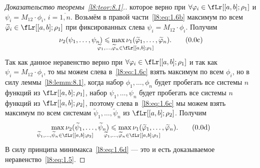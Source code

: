 \begin{proof}[Доказательство теоремы~\ref{l8:teor:8.1}.]
	которое верно при $\forall\phi_i\in\fLr[{[a,b];\rho_1}]$ и $\psi_i=M_{12}\cdot\phi_i$, $i=\overline{1,n}$. Возьмём в правой части~\eqref{l8:eq:1.6b} максимум по всем $\widetilde{\phi}_i\in\fLr[{[a,b];\rho_1}]$ при фиксированных слева $\psi_i=M_{12}\cdot\phi_i$. Получим
	\begin{equation}\label{l8:eq:1.6c}
		\nu_2(\psi_1,\ldots,\psi_n)\leqslant\max\limits_{\lefteqn{\vphantom{\big(}\scriptstyle \widetilde{\phi}_1,\ldots,\widetilde{\phi}_n\in\fLr[{[a,b];\rho_1}]}}\nu_1(\widetilde{\phi}_1,\ldots,\widetilde{\phi}_n).\tag{\theequation c}
	\end{equation}
	Так как данное неравенство верно при $\forall\phi_i\in\fLr[{[a,b];\rho_1}]$ и так как $\psi_i=M_{12}\cdot\phi_i$, то мы можем слева в~\eqref{l8:eq:1.6c} взять максимум по всем $\phi_i$, но в силу леммы~\ref{l8:lemm:8.1}{\mb,} когда набор $\phi_1,\ldots,\phi_n$ будет пробегать все системы $n$ функций из $\fLr[{[a,b];\rho_1}]$,  набор $\psi_1,\ldots,\psi_n$ будет пробегать все системы $n$ функций из $\fLr[{[a,b];\rho_2}]$, поэтому слева в~\eqref{l8:eq:1.6c} мы можем взять максимум по всем системам $\widetilde{\psi}_1,\ldots,\widetilde{\psi}_n$ из $\fLr[{[a,b];\rho_2}]$. Получим
	\begin{equation}\label{l8:eq:1.6d}
		\max\limits_{\lefteqn{\vphantom{\big(}\scriptstyle \widetilde{\psi}_1,\ldots,\widetilde{\psi}_n\in\fLr[{[a,b];\rho_2}]}}\nu_2(\widetilde{\psi}_1,\ldots,\widetilde{\psi}_n)\leqslant\max\limits_{\lefteqn{\vphantom{\big(}\scriptstyle \widetilde{\phi}_1,\ldots,\widetilde{\phi}_n\in\fLr[{[a,b];\rho_1}]}}\nu_1(\widetilde{\phi}_1,\ldots,\widetilde{\phi}_n).\tag{\theequation d}
	\end{equation}
	В силу принципа минимакса~\eqref{l8:eq:1.6d} --- это и есть доказываемое неравенство~\eqref{l8:eq:1.5}.
\end{proof}

